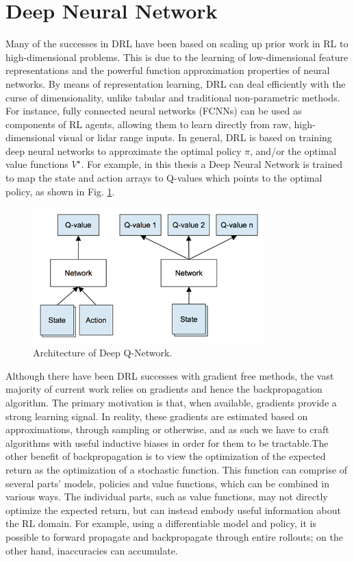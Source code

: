 \section{Deep Neural Network}

Many of the successes in DRL have been based on scaling up prior work in RL to high-dimensional problems. This is due to the learning of low-dimensional feature representations and the powerful function approximation properties of neural networks. By means of representation learning, DRL can deal efficiently with the curse of dimensionality, unlike tabular and traditional non-parametric methods. For instance, fully connected neural networks (FCNNs) can be used as components of RL agents, allowing them to learn directly from raw, high-dimensional visual or lidar range inputs. In general, DRL is based on training deep neural networks to approximate the optimal policy $\pi$, and/or the optimal value functions $V^\star$. For example, in this thesis a Deep Neural Network is trained to map the state and action arrays to Q-values which points to the optimal policy, as shown in Fig. \ref{fig:dqn-architecture}. 

\begin{figure}[h]
\centering
\includegraphics[width=0.8\textwidth]{figs/ch4/architecture-of-deep-q-network}
\caption{Architecture of Deep Q-Network.}
\label{fig:dqn-architecture}
\end{figure}

Although there have been DRL successes with gradient free methods, the vast majority of current work relies on gradients and hence the backpropagation algorithm. The primary motivation is that, when available, gradients provide a strong learning signal. In reality, these gradients are estimated based on approximations, through sampling or otherwise, and as such we have to craft algorithms with useful inductive biases in order for them to be tractable.The other benefit of backpropagation is to view the optimization of the expected return as the optimization of a stochastic function. This function can comprise of several parts' models, policies and value functions, which can be combined in various ways. The individual parts, such as value functions, may not directly optimize the expected return, but can instead embody useful information about the RL domain. For example, using a differentiable model and policy, it is possible to forward propagate and backpropagate through entire rollouts; on the other hand, inaccuracies can accumulate.

